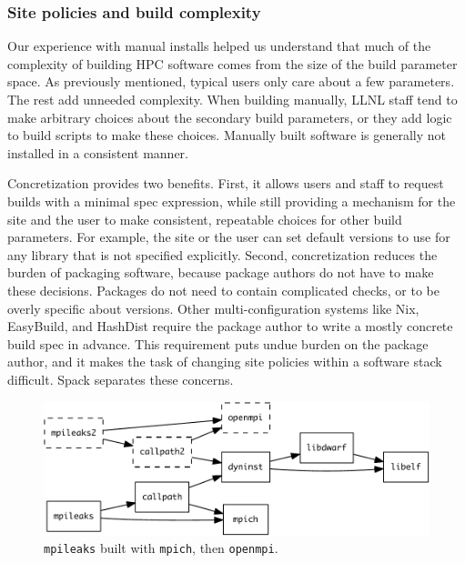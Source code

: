 \subsubsection{Site policies and build complexity}

Our experience with manual installs helped us understand that much of the complexity
of building HPC software comes from the size of the build parameter space.
As previously mentioned, typical users only care about a few parameters.
The rest add unneeded complexity.  When building manually, LLNL staff
tend to make arbitrary choices about the secondary build parameters,
or they add logic to build scripts to make these choices.
Manually built software is generally not installed in a consistent manner.

Concretization provides two benefits.  First, it allows users and staff to
request builds with a minimal spec expression, while still providing a
mechanism for the site and the user to make consistent, repeatable choices 
for other build parameters.  For example, the site or the user can set 
default versions to use for any library that is not specified explicitly.
%
Second, concretization reduces the burden of packaging software, because
package authors do not have to make these decisions. Packages do not need 
to contain complicated checks, or to be overly specific about versions.  
Other multi-configuration systems like Nix, EasyBuild, and HashDist require 
the package author to write a mostly concrete build spec in advance.
This requirement puts undue burden on the package author, and it makes the task
of changing site policies within a software stack difficult.  Spack
separates these concerns.

\begin{figure}\centering
   \includegraphics[width=.9\linewidth]{specs/rpaths.pdf}
   \caption{
       {\tt mpileaks} built with {\tt mpich}, then {\tt openmpi}.
       \label{fig:reuse}
   }
\end{figure}
